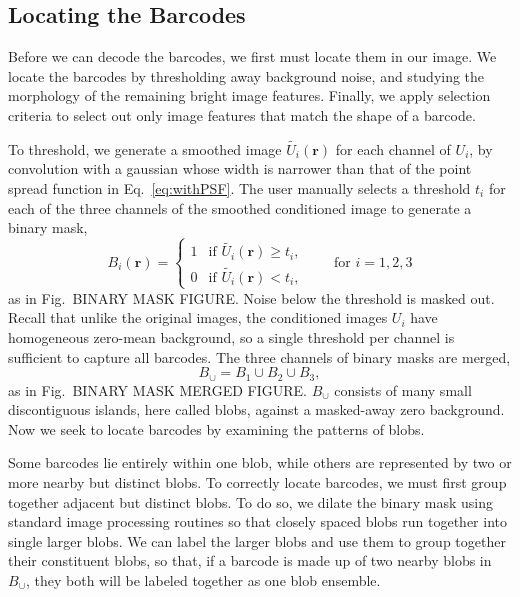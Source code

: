 \subsection{Locating the Barcodes} \label{sec:locatingBarcodes}
Before we can decode the barcodes, we first must locate them in our image. We locate the barcodes by thresholding away background noise, and studying the morphology of the remaining bright image features. Finally, we apply selection criteria to select out only image features that match the shape of a barcode. 

 To threshold, we generate a smoothed image $\tilde{U_i}(\mathbf{r})$ for each channel of $U_i$, by  convolution with a gaussian whose width is narrower than that of the point spread function in Eq.~\ref{eq:withPSF}. The user manually selects a threshold $t_i$ for each of the three channels of the smoothed conditioned image to generate a binary mask,
\begin{equation}
	B_i(\mathbf{r}) = \left\{
	\begin{array}{rl}
		 1 & \text{if } \tilde{U_i}(\mathbf{r}) \geq t_i,\\
		 0 & \text{if } \tilde{U_i}(\mathbf{r}) < t_i,
	\end{array} \right. \qquad\text{for } i=1,2,3
\end{equation}
as in Fig.~BINARY MASK FIGURE. Noise below the threshold is masked out. Recall that unlike the original images, the conditioned images $U_i$ have homogeneous zero-mean  background, so a single threshold per channel is sufficient to capture all barcodes. The three channels of binary masks are merged, 
\begin{equation}
B_{\cup}=B_1\cup B_2 \cup B_3, 
\end{equation}
as in Fig.~BINARY MASK MERGED FIGURE. $B_\cup$ consists of many small discontiguous islands, here called blobs, against a masked-away zero background.  Now we seek to locate barcodes by examining the patterns of blobs.

Some barcodes lie entirely within one blob, while others are represented by two or more nearby but distinct blobs. To correctly locate barcodes, we must first  group together adjacent but distinct blobs.  To do so, we dilate the binary mask using standard image processing routines \citep{matlab_version_2010} so that closely spaced blobs run together into single larger blobs. We can label the larger blobs and use them to group together their constituent blobs, so that, if a barcode is made up of two nearby blobs in $B_\cup$, they both will be labeled together as one blob ensemble.

